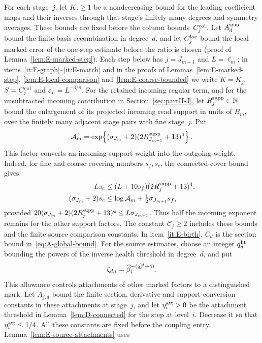 For each stage~$j$, let $K_j\ge1$ be a nondecreasing bound for the leading coefficient maps and their inverses through that stage's finitely many degrees and symmetry averages. These bounds are fixed before the column bounds~$C^{\rm col}_j$. Let $A_d^{\rm sym}$ bound the finite basis recombination in degree~$d$, and let $C_j^{\rm loc}$ bound the local marked error of the one-step estimate before the ratio is chosen (proof of Lemma~\ref{lem:E-marked-step}). Each step below has $j=J_{m+1}$ and $L=\ell_m$; in items~\ref{it:E-graph}--\ref{it:E-match} and in the proofs of Lemmas~\ref{lem:E-marked-step}, \ref{lem:E-local-comparison} and~\ref{lem:E-coarse-bounded} we write $K=K_j$, $S=C^{\rm col}_j$ and $\varepsilon_L=L^{-3/8}$. For the retained incoming regular term, and for the unsubtracted incoming contribution in Section~\ref{sec:partII-J}, let $R_j^{\rm supp}\in\mathbb{N}$ bound the enlargement of its projected incoming read support in units of $B_m$, over the finitely many adjacent stage pairs with fine stage~$j$. Put
\begin{equation}\label{eq:E-support-conversion}
 \mathcal A_m=\exp\!\left\{(\sigma_{J_m}+2)(2R_{J_{m+1}}^{\rm supp}+13)^4\right\}.
\end{equation}
This factor converts an incoming support weight into the outgoing weight. Indeed, for fine and coarse covering numbers $s_f,s_c$, the connected-cover bound gives
\begin{align*}
 Ls_c&\le(L+10s_f)(2R_j^{\rm supp}+13)^4,\\
 (\sigma_{J_m}+2)s_c
 &\le\log\mathcal A_m+\tfrac12\sigma_{J_{m+1}}s_f,
\end{align*}
provided $20(\sigma_{J_m}+2)(2R_j^{\rm supp}+13)^4\le L\sigma_{J_{m+1}}$. Thus half the incoming exponent remains for the other support factors. The constant $\mathcal C_j\ge2$ includes these bounds and the finite source comparison constants. In item~\ref{it:E-birth}, $C_d$ is the section bound in~\eqref{eq:A-global-bound}.
For the source estimates, choose an integer $q^{\rm ht}_d$ bounding the powers of the inverse health threshold in degree~$d$, and put
\begin{equation*}
 \zeta_{d,i}=\widehat\beta_i^{-(q^{\rm ht}_d+4)}.
\end{equation*}
This allowance controls attachments of other marked factors to a distinguished mark. Let $A_{j,d}$ bound the finite section, derivative and support-conversion constants in these attachments at stage~$j$, and let $\eta^{\rm att}_i>0$ be the attachment threshold in Lemma~\ref{lem:D-connected} for the step at level~$i$. Decrease it so that $\eta^{\rm att}_i\le1/4$. All these constants are fixed before the coupling entry. Lemma~\ref{lem:E-source-attachments} uses
